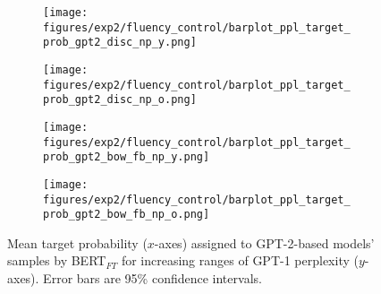 \begin{figure}[H]
     \centering
     \begin{subfigure}[b]{0.48\textwidth}
        \centering
        \texttt{[image: figures/exp2/fluency\_control/barplot\_ppl\_target\_prob\_gpt2\_disc\_np\_y.png]}
        \caption{}
        \label{subfig:barplot_ppl_target_prob_np_gpt2_disc_young}
     \end{subfigure}
     \quad
     \begin{subfigure}[b]{0.48\textwidth}
        \centering
        \texttt{[image: figures/exp2/fluency\_control/barplot\_ppl\_target\_prob\_gpt2\_disc\_np\_o.png]}
        \caption{}
        \label{subfig:barplot_ppl_target_prob_np_gpt2_disc_old}
     \end{subfigure}
    \medskip
    \begin{subfigure}[b]{0.48\textwidth}
        \centering
        \texttt{[image: figures/exp2/fluency\_control/barplot\_ppl\_target\_prob\_gpt2\_bow\_fb\_np\_y.png]}
        \caption{}
        \label{subfig:barplot_ppl_target_prob_np_gpt2_bow_young}
     \end{subfigure}
    \quad
     \begin{subfigure}[b]{0.48\textwidth}
        \centering
        \texttt{[image: figures/exp2/fluency\_control/barplot\_ppl\_target\_prob\_gpt2\_bow\_fb\_np\_o.png]}
        \caption{}
        \label{subfig:barplot_ppl_target_prob_np_gpt2_bow_old}
     \end{subfigure}
    \caption{Mean target probability ($x$-axes) assigned to GPT-2-based models' samples by BERT$_{FT}$ for increasing ranges of GPT-1 perplexity ($y$-axes). Error bars are 95\% confidence intervals.}
    \label{fig:barplot_ppl_target_prob_np_gpt2}
\end{figure}

